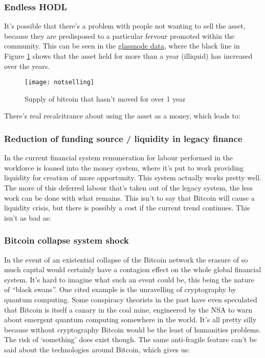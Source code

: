 \subsubsection{Endless HODL}
It's possible that there's a problem with people not wanting to sell the asset, because they are predisposed to a particular fervour promoted within the community. This can be seen in the \href{https://twitter.com/DylanLeClair_/status/1521123370233962497}{glassnode data}, where the black line in Figure \ref{fig:notselling} shows that the asset held for more than a year (illiquid) has increased over the years.
\begin{figure}
  \centering
    \texttt{[image: notselling]}
  \caption{Supply of bitcoin that hasn't moved for over 1 year}
  \label{fig:notselling}
\end{figure}
There's real recalcitrance about using the asset as a money, which leads to:
\subsubsection{Reduction of funding source / liquidity in legacy finance}
In the current financial system remuneration for labour performed in the workforce is loaned into the money system, where it's put to work providing liquidity for creation of more opportunity. This system actually works pretty well. The more of this deferred labour that's taken out of the legacy system, the less work can be done with what remains. This isn't to say that Bitcoin will cause a liquidity crisis, but there is possibly a cost if the current trend continues. This isn't as bad as:
\subsubsection{Bitcoin collapse system shock}
In the event of an existential collapse of the Bitcoin network the erasure of so much capital would certainly have a contagion effect on the whole global financial system. It's hard to imagine what such an event could be, this being the nature of ``black swans''. One cited example is the unravelling of cryptography by quantum computing. Some conspiracy theorists in the past have even speculated that Bitcoin is itself a canary in the coal mine, engineered by the NSA to warn about emergent quantum computing somewhere in the world. It's all pretty silly because without cryptography Bitcoin would be the least of humanities problems. The risk of `something' does exist though. The same anti-fragile feature can't be said about the technologies around Bitcoin, which gives us:
